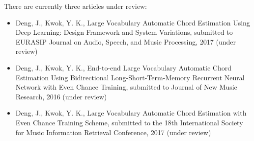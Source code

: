 There are currently three articles under review:
\begin{itemize}
\item Deng, J., Kwok, Y. K., Large Vocabulary Automatic Chord Estimation Using Deep Learning: Design Framework and System Variations, submitted to EURASIP Journal on Audio, Speech, and Music Processing, 2017 (under review)
\item Deng, J., Kwok, Y. K., End-to-end Large Vocabulary Automatic Chord Estimation Using Bidirectional Long-Short-Term-Memory Recurrent Neural Network with Even Chance Training, submitted to Journal of New Music Research, 2016 (under review)
\item Deng, J., Kwok, Y. K., Large Vocabulary Automatic Chord Estimation with Even Chance Training Scheme, submitted to the 18th International Society for Music Information Retrieval Conference, 2017 (under review)
\end{itemize}



